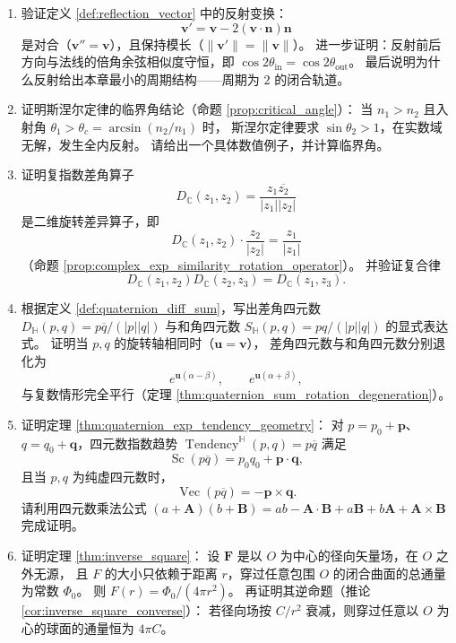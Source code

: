 \begin{enumerate}[leftmargin=3em, label=\textbf{题 \arabic*}]
    \item 验证定义 \ref{def:reflection_vector} 中的反射变换：
    \[
    \mathbf{v}'=\mathbf{v}-2(\mathbf{v}\cdot\mathbf{n})\mathbf{n}
    \]
    是对合（$\mathbf{v}''=\mathbf{v}$），且保持模长（$\|\mathbf{v}'\|=\|\mathbf{v}\|$）。
    进一步证明：反射前后方向与法线的倍角余弦相似度守恒，即
    $\cos 2\theta_{\text{in}}=\cos 2\theta_{\text{out}}$。
    最后说明为什么反射给出本章最小的周期结构——周期为 $2$ 的闭合轨道。

    \item 证明斯涅尔定律的临界角结论（命题 \ref{prop:critical_angle}）：
    当 $n_1>n_2$ 且入射角 $\theta_1>\theta_c=\arcsin(n_2/n_1)$ 时，
    斯涅尔定律要求 $\sin\theta_2>1$，在实数域无解，发生全内反射。
    请给出一个具体数值例子，并计算临界角。

    \item 证明复指数差角算子
    \[
    D_{\mathbb{C}}(z_1,z_2)=\frac{z_1\overline{z_2}}{|z_1||z_2|}
    \]
    是二维旋转差异算子，即
    \[
    D_{\mathbb{C}}(z_1,z_2)\cdot\frac{z_2}{|z_2|}=\frac{z_1}{|z_1|}
    \]
    （命题 \ref{prop:complex_exp_similarity_rotation_operator}）。
    并验证复合律
    \[
    D_{\mathbb{C}}(z_1,z_2)D_{\mathbb{C}}(z_2,z_3)=D_{\mathbb{C}}(z_1,z_3).
    \]

    \item 根据定义 \ref{def:quaternion_diff_sum}，写出差角四元数
    $D_{\mathbb{H}}(p,q)=p\overline{q}/(|p||q|)$ 与和角四元数
    $S_{\mathbb{H}}(p,q)=pq/(|p||q|)$ 的显式表达式。
    证明当 $p,q$ 的旋转轴相同时（$\mathbf{u}=\mathbf{v}$），
    差角四元数与和角四元数分别退化为
    \[
    e^{\mathbf{u}(\alpha-\beta)},\qquad e^{\mathbf{u}(\alpha+\beta)},
    \]
    与复数情形完全平行（定理 \ref{thm:quaternion_sum_rotation_degeneration}）。

    \item 证明定理 \ref{thm:quaternion_exp_tendency_geometry}：
    对 $p=p_0+\mathbf{p}$、$q=q_0+\mathbf{q}$，四元数指数趋势
    $\operatorname{Tendency}^{\mathbb{H}}(p,q)=p\overline{q}$ 满足
    \[
    \operatorname{Sc}(p\overline{q})=p_0q_0+\mathbf{p}\cdot\mathbf{q},
    \]
    且当 $p,q$ 为纯虚四元数时，
    \[
    \operatorname{Vec}(p\overline{q})=-\mathbf{p}\times\mathbf{q}.
    \]
    请利用四元数乘法公式
    $(a+\mathbf{A})(b+\mathbf{B})=ab-\mathbf{A}\cdot\mathbf{B}+a\mathbf{B}+b\mathbf{A}+\mathbf{A}\times\mathbf{B}$
    完成证明。

    \item 证明定理 \ref{thm:inverse_square}：
    设 $\mathbf{F}$ 是以 $O$ 为中心的径向矢量场，在 $O$ 之外无源，
    且 $F$ 的大小只依赖于距离 $r$，穿过任意包围 $O$ 的闭合曲面的总通量为常数 $\Phi_0$。
    则 $F(r)=\Phi_0/(4\pi r^2)$。
    再证明其逆命题（推论 \ref{cor:inverse_square_converse}）：
    若径向场按 $C/r^2$ 衰减，则穿过任意以 $O$ 为心的球面的通量恒为 $4\pi C$。


\end{enumerate}

